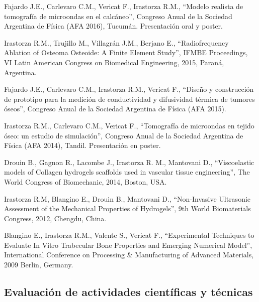 \documentclass[margin,line]{res}
\begin{document}
\begin{resume}
Fajardo J.E., Carlevaro C.M., Vericat F., Irastorza R.M., ``Modelo realista de tomografía de microondas en el calcáneo'', Congreso Anual de la Sociedad Argentina de Física (AFA 2016), Tucumán. Presentación oral y poster.

Irastorza R.M., Trujillo M., Villagrán J.M., Berjano E., ``Radiofrequency Ablation of Osteoma Osteoide: A Finite Element Study'', IFMBE Proceedings, VI Latin American Congress on Biomedical Engineering, 2015, Paraná, Argentina. 

Fajardo J.E., Carlevaro C.M., Irastorza R.M., Vericat F., ``Diseño y construcción de prototipo para la medición de conductividad y difusividad térmica de tumores óseos'', Congreso Anual de la Sociedad Argentina de Física (AFA 2015).

Irastorza R.M., Carlevaro C.M., Vericat F., ``Tomografía de microondas en tejido óseo: un estudio de simulación'', Congreso Anual de la Sociedad Argentina de Física (AFA 2014), Tandil. Presentación en poster.

Drouin B., Gagnon R., Lacombe J., Irastorza R. M., Mantovani D., ``Viscoelastic models of Collagen hydrogels scaffolds used in vascular tissue engineering'', The World Congress of Biomechanic, 2014, Boston, USA.

Irastorza R.M, Blangino E., Drouin B., Mantovani D., ``Non-Invasive Ultrasonic Assessment of the Mechanical Properties of Hydrogels'', 9th World Biomaterials Congress, 2012, Chengdu, China.

Blangino E., Irastorza R.M., Valente S., Vericat F., ``Experimental Techniques to Evaluate In Vitro Trabecular Bone Properties and Emerging Numerical Model'', International Conference on Processing \& Manufacturing of Advanced Materials, 2009 Berlin, Germany.
%
%
%

\subsection{ Evaluación de actividades científicas y técnicas}


\end{resume}
\end{document}
